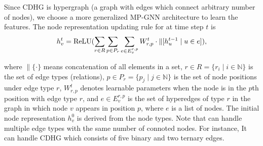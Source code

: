 
Since CDHG is hypergraph (a graph with edges which connect arbitrary number of nodes), we choose a more generalized MP-GNN architecture \hyperedgeGNN to learn the features.
The node representation updating rule for \hyperedgeGNN at time step $t$ is
\begin{equation}\label{eq:hyperedge-GNN-definition}
  h_{v}^{t} = {\rm ReLU}(\sum_{r\in R}\sum_{p\in P_{r}}
  \sum_{e \in E_v^{r,p}}
  W_{r,p}^{t}\cdot \| [ h_{u}^{t-1}\mid u\in e ] ),
\end{equation}


where $\| \{\cdot \}$ means concatenation of all elements in a set, 
$r \in R = \{ r_i \mid i \in \mathbb{N} \}$ is the set of edge types (relations), 
$p \in P_{r} = \{ p_{j} \mid j\in \mathbb{N} \}$ is the set of node positions under edge type $r$,
$W_{r,p}^{t}$ denotes learnable parameters when the node is in the $p$th position with edge type $r$, and  $e\in E_v^{r,p}$ is the set of hyperedges of type $r$ in the graph in which node $v$ appears in position $p$, where
$e$ is a list of nodes.
The initial node representation $h_{v}^{0}$ is derived from the node types. Note that \hyperedgeGNN can handle multiple edge types with the same number of connoted nodes. For instance, It can handle CDHG which consists of five binary and two ternary edges.




